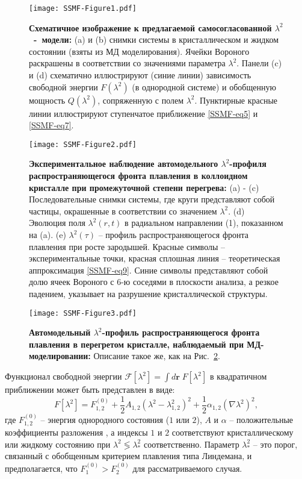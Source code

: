 \begin{figure}[!t]
\centering
 \texttt{[image: SSMF-Figure1.pdf]}
 \caption{\textbf{Схематичное изображение к предлагаемой самосогласованной $\lambda^2$~-~модели:}
 (a) и (b) снимки системы в кристаллическом и жидком состоянии (взяты из МД моделирования).
  Ячейки Вороного раскрашены в соответствии со значениями параметра $ \lambda^2$.
  Панели (c) и (d) схематично иллюстрируют (синие линии) зависимость свободной энергии $ F (\lambda ^ 2) $ (в однородной системе) и обобщенную мощность $ Q (\lambda ^ 2) $, сопряженную с полем $\lambda^2$.
 Пунктирные красные линии иллюстрируют ступенчатое приближение \eqref{SSMF-eq5} и \eqref{SSMF-eq7}.
 }
\label{SSMF-Figure1}
\end{figure}

\begin{figure*}[!t]
\centering
 \texttt{[image: SSMF-Figure2.pdf]}
 \caption{\textbf{Экспериментальное наблюдение автомодельного $\lambda^2$-профиля распространяющегося фронта плавления в коллоидном кристалле при промежуточной степени перегрева:}
 (a) - (c) Последовательные снимки системы, где круги представляют собой частицы, окрашенные в соответствии со значением $\lambda^2$.
 (d) Эволюция поля $\lambda^2(r, t)$ в радиальном направлении (1), показанном на (a).
 (e) $\lambda^2(\tau)$ -- профиль распространяющегося фронта плавления при росте зародышей.
 Красные символы -- экспериментальные точки, красная сплошная линия -- теоретическая аппроксимация \eqref{SSMF-eq9}.
 Синие символы представляют собой долю ячеек Вороного с 6-ю соседями в плоскости анализа, а резкое падением, указывает на разрушение кристаллической структуры.}
\label{SSMF-Figure2}
\end{figure*}

\begin{figure*}[!t]
\centering
 \texttt{[image: SSMF-Figure3.pdf]}
 \caption{\textbf{Автомодельный $ \lambda^2$-профиль распространяющегося фронта плавления в перегретом кристалле, наблюдаемый при МД-моделировании:} Описание такое же, как на Рис.~\ref{SSMF-Figure2}.}
\label{SSMF-Figure3}
\end{figure*}

Функционал свободной энергии $\mathcal{F}[\lambda^2] = \int{d\mathbf{r}\;F[\lambda^2]}$ в квадратичном приближении может быть представлен в виде:
\begin{equation}
\label{SSMF-eq5}
F[\lambda^2] = F_{\mathrm{1,2}}^{(0)}+\frac{1}{2}A_{1,2}\left(\lambda^2-\lambda_{1,2}^2\right)^2 + \frac{1}{2}\alpha_{1,2}\left(\nabla\lambda^2\right)^2,
\end{equation}
где $F_{1,2}^{(0)}$ -- энергия однородного состояния ($1$ или $2$), $A$ и $\alpha$ -- положительные коэффициенты разложения \cite{book.desai}, а индексы $ 1 $ и $ 2 $ соответствуют кристаллическому или жидкому состоянию при $\lambda^2 \lessgtr \lambda_\ast^2$ соответственно.
Параметр $\lambda_\ast^2 $ -- это порог, связанный с обобщенным критерием плавления типа Линдемана, и предполагается, что $ F_{\mathrm{1}} ^ {(0)}> F_{\mathrm{2}} ^ {(0)} $ для рассматриваемого случая.


